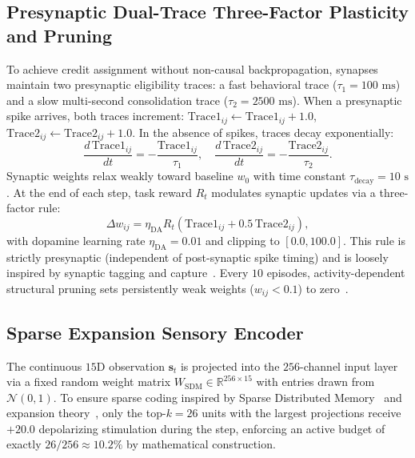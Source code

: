 \documentclass[journal]{IEEEtran}
\begin{document}
\subsection{Presynaptic Dual-Trace Three-Factor Plasticity and Pruning}
To achieve credit assignment without non-causal backpropagation, synapses maintain two presynaptic eligibility traces: a fast behavioral trace ($\tau_1 = 100\text{ ms}$) and a slow multi-second consolidation trace ($\tau_2 = 2500\text{ ms}$). When a presynaptic spike arrives, both traces increment: $\text{Trace1}_{ij} \leftarrow \text{Trace1}_{ij} + 1.0$, $\text{Trace2}_{ij} \leftarrow \text{Trace2}_{ij} + 1.0$. In the absence of spikes, traces decay exponentially:
\begin{equation}
\frac{d\,\text{Trace1}_{ij}}{dt} = -\frac{\text{Trace1}_{ij}}{\tau_1}, \quad \frac{d\,\text{Trace2}_{ij}}{dt} = -\frac{\text{Trace2}_{ij}}{\tau_2}.
\label{eq:traces}
\end{equation}
Synaptic weights relax weakly toward baseline $w_0$ with time constant $\tau_{\mathrm{decay}} = 10\text{ s}$. At the end of each step, task reward $R_t$ modulates synaptic updates via a three-factor rule:
\begin{equation}
\Delta w_{ij} = \eta_{\mathrm{DA}} R_t \left(\text{Trace1}_{ij} + 0.5\,\text{Trace2}_{ij}\right),
\label{eq:three_factor}
\end{equation}
with dopamine learning rate $\eta_{\mathrm{DA}} = 0.01$ and clipping to $[0.0, 100.0]$. This rule is strictly presynaptic (independent of post-synaptic spike timing) and is loosely inspired by synaptic tagging and capture~\cite{Frey1997SynapticTagging}. Every $10$ episodes, activity-dependent structural pruning sets persistently weak weights ($w_{ij} < 0.1$) to zero~\cite{Navlakha2015Pruning}.

\subsection{Sparse Expansion Sensory Encoder}
The continuous $15\text{D}$ observation $\mathbf{s}_t$ is projected into the $256$-channel input layer via a fixed random weight matrix $W_{\mathrm{SDM}} \in \mathbb{R}^{256 \times 15}$ with entries drawn from $\mathcal{N}(0, 1)$. To ensure sparse coding inspired by Sparse Distributed Memory~\cite{Kanerva1988SDM} and expansion theory~\cite{Babadi2014Sparse}, only the top-$k = 26$ units with the largest projections receive $+20.0$ depolarizing stimulation during the step, enforcing an active budget of exactly $26/256 \approx 10.2\%$ by mathematical construction.
\end{document}
